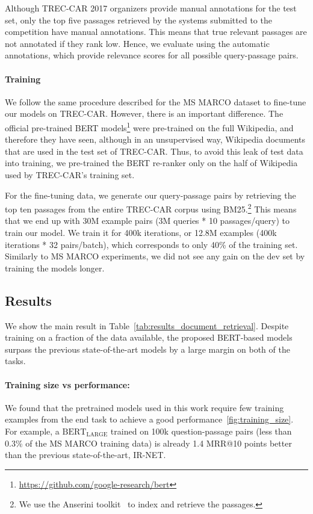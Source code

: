 \documentclass{article} %
\begin{document}
Although TREC-CAR 2017 organizers provide manual annotations for the test set, only the top five passages retrieved by the systems submitted to the competition have manual annotations. This means that true relevant passages are not annotated if they rank low. Hence, we evaluate using the automatic annotations, which provide relevance scores for all possible query-passage pairs.

\paragraph{Training}

We follow the same procedure described for the MS MARCO dataset to fine-tune our models on TREC-CAR. However, there is an important difference. The official pre-trained BERT models\footnote{
\url{https://github.com/google-research/bert}
} 
were pre-trained on the full Wikipedia, and therefore they have seen, although in an unsupervised way, Wikipedia documents that are used in the test set of TREC-CAR. Thus, to avoid this leak of test data into training, we pre-trained the BERT re-ranker only on the half of Wikipedia used by TREC-CAR's training set.

For the fine-tuning data, we generate our query-passage pairs by retrieving the top ten passages from the entire TREC-CAR corpus using BM25.\footnote{We use the Anserini toolkit~\citep{yang2018anserini} to index and retrieve the passages.} This means that we end up with 30M example pairs (3M queries * 10 passages/query) to train our model. We train it for 400k iterations, or 12.8M examples (400k iterations * 32 pairs/batch), which corresponds to only 40\% of the training set. Similarly to MS MARCO experiments, we did not see any gain on the dev set by training the models longer.

\subsection{Results}

We show the main result in
Table~\ref{tab:results_document_retrieval}. Despite training on a fraction of the data available, the proposed BERT-based models surpass the previous state-of-the-art models by a large margin on both of the tasks.

\paragraph{Training size vs performance:} We found that the pretrained models used in this work require few training examples from the end task to achieve a good performance~\ref{fig:training_size}. For example, a $\text{BERT}_\text{LARGE}$ trained on 100k question-passage pairs (less than 0.3\% of the MS MARCO training data) is already 1.4 MRR@10 points better than the previous state-of-the-art, IR-NET.
\end{document}
